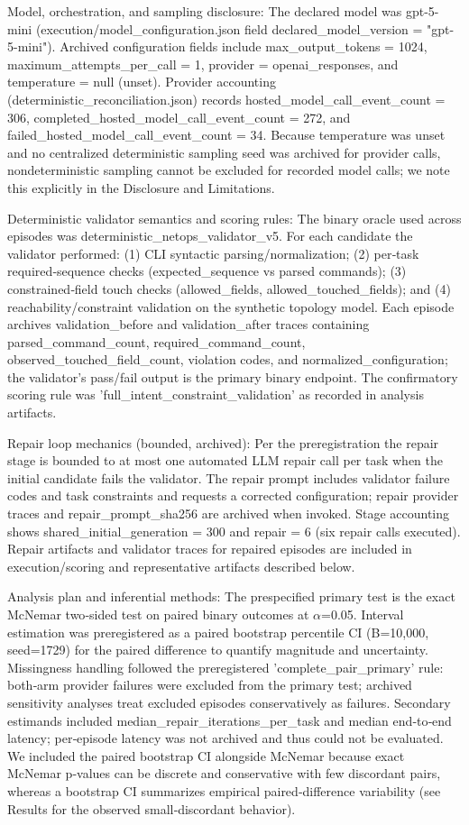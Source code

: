 \documentclass[conference]{IEEEtran}
\begin{document}
Model, orchestration, and sampling disclosure: The declared model was gpt-5-mini (execution/model\_configuration.json field declared\_model\_version = "gpt-5-mini"). Archived configuration fields include max\_output\_tokens = 1024, maximum\_attempts\_per\_call = 1, provider = openai\_responses, and temperature = null (unset). Provider accounting (deterministic\_reconciliation.json) records hosted\_model\_call\_event\_count = 306, completed\_hosted\_model\_call\_event\_count = 272, and failed\_hosted\_model\_call\_event\_count = 34. Because temperature was unset and no centralized deterministic sampling seed was archived for provider calls, nondeterministic sampling cannot be excluded for recorded model calls; we note this explicitly in the Disclosure and Limitations.

Deterministic validator semantics and scoring rules: The binary oracle used across episodes was deterministic\_netops\_validator\_v5. For each candidate the validator performed: (1) CLI syntactic parsing/normalization; (2) per‑task required‑sequence checks (expected\_sequence vs parsed commands); (3) constrained‑field touch checks (allowed\_fields, allowed\_touched\_fields); and (4) reachability/constraint validation on the synthetic topology model. Each episode archives validation\_before and validation\_after traces containing parsed\_command\_count, required\_command\_count, observed\_touched\_field\_count, violation codes, and normalized\_configuration; the validator's pass/fail output is the primary binary endpoint. The confirmatory scoring rule was 'full\_intent\_constraint\_validation' as recorded in analysis artifacts.

Repair loop mechanics (bounded, archived): Per the preregistration the repair stage is bounded to at most one automated LLM repair call per task when the initial candidate fails the validator. The repair prompt includes validator failure codes and task constraints and requests a corrected configuration; repair provider traces and repair\_prompt\_sha256 are archived when invoked. Stage accounting shows shared\_initial\_generation = 300 and repair = 6 (six repair calls executed). Repair artifacts and validator traces for repaired episodes are included in execution/scoring and representative artifacts described below.

Analysis plan and inferential methods: The prespecified primary test is the exact McNemar two‑sided test on paired binary outcomes at \ensuremath{\alpha}=0.05. Interval estimation was preregistered as a paired bootstrap percentile CI (B=10,000, seed=1729) for the paired difference to quantify magnitude and uncertainty. Missingness handling followed the preregistered 'complete\_pair\_primary' rule: both‑arm provider failures were excluded from the primary test; archived sensitivity analyses treat excluded episodes conservatively as failures. Secondary estimands included median\_repair\_iterations\_per\_task and median end‑to‑end latency; per‑episode latency was not archived and thus could not be evaluated. We included the paired bootstrap CI alongside McNemar because exact McNemar p‑values can be discrete and conservative with few discordant pairs, whereas a bootstrap CI summarizes empirical paired‑difference variability (see Results for the observed small‑discordant behavior).
\end{document}
